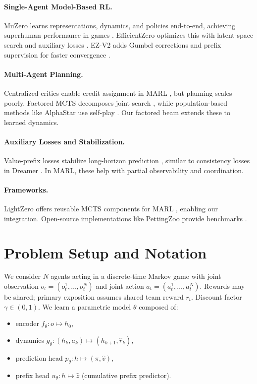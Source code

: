 \documentclass{article}
\begin{document}
\paragraph{Single-Agent Model-Based RL.} MuZero learns representations, dynamics, and policies end-to-end, achieving superhuman performance in games \cite{schrittwieser2019mastering}. EfficientZero optimizes this with latent-space search and auxiliary losses \cite{ye2021mastering}. EZ-V2 adds Gumbel corrections and prefix supervision for faster convergence \cite{wang2024efficientzero}.

\paragraph{Multi-Agent Planning.} Centralized critics enable credit assignment in MARL \cite{lowe2017multi}, but planning scales poorly. Factored MCTS decomposes joint search \cite{bellemare2024multiagent}, while population-based methods like AlphaStar use self-play \cite{vinyals2019grandmaster}. Our factored beam extends these to learned dynamics.

\paragraph{Auxiliary Losses and Stabilization.} Value-prefix losses stabilize long-horizon prediction \cite{wang2024efficientzero}, similar to consistency losses in Dreamer \cite{hafner2023dreamer}. In MARL, these help with partial observability and coordination.

\paragraph{Frameworks.} LightZero offers reusable MCTS components for MARL \cite{lightzero2023}, enabling our integration. Open-source implementations like PettingZoo provide benchmarks \cite{terry2020pettingzoo}.

\section{Problem Setup and Notation}
We consider $N$ agents acting in a discrete-time Markov game with joint observation $o_t=(o_t^1,\dots,o_t^N)$ and joint action $a_t=(a_t^1,\dots,a_t^N)$. Rewards may be shared; primary exposition assumes shared team reward $r_t$. Discount factor $\gamma\in(0,1)$. We learn a parametric model $\theta$ composed of:
\begin{itemize}[noitemsep]
  \item encoder $f_\theta: o \mapsto h_0$,
  \item dynamics $g_\theta: (h_k,a_k)\mapsto (h_{k+1}, \hat r_k)$,
  \item prediction head $p_\theta: h \mapsto (\pi,\hat v)$,
  \item prefix head $u_\theta: h \mapsto \hat z$ (cumulative prefix predictor).
\end{itemize}
\end{document}
